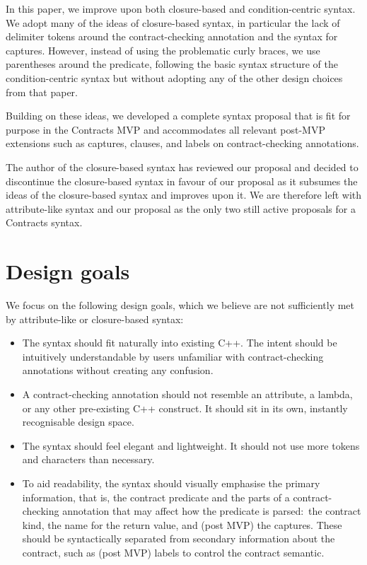 In this paper, we improve upon both closure-based and condition-centric syntax. We adopt many of the ideas of closure-based syntax, in particular the lack of delimiter tokens around the contract-checking annotation and the syntax for captures. However, instead of using the problematic curly braces, we use parentheses around the predicate, following the basic syntax structure of the condition-centric syntax \cite{P2737R0} but without adopting any of the other design choices from that paper.

Building on these ideas, we developed a complete syntax proposal that is fit for purpose in the Contracts MVP and accommodates all relevant post-MVP extensions such as captures,  clauses, and labels on contract-checking annotations.

The author of the closure-based syntax has reviewed our proposal and decided to discontinue the closure-based syntax in favour of our proposal as it subsumes the ideas of the closure-based syntax and improves upon it. We are therefore left with attribute-like syntax and our proposal as the only two still active proposals for a Contracts syntax.



\section{Design goals}
\label{sec:design}

We focus on the following design goals, which we believe are not sufficiently met by attribute-like or closure-based syntax:

\begin{itemize}
\item The syntax should fit naturally into existing C++. The intent should be intuitively understandable by users unfamiliar with contract-checking annotations without creating any confusion.
\item A contract-checking annotation should not resemble an attribute, a lambda, or any other pre-existing C++ construct. It should sit in its own, instantly recognisable design space.
\item The syntax should feel elegant and lightweight. It should not use more tokens and characters than necessary.
\item To aid readability, the syntax should visually emphasise the primary information, that is, the contract predicate and the parts of a contract-checking annotation that may affect how the predicate is parsed: the contract kind, the name for the return value, and (post MVP) the captures. These should be syntactically separated from secondary information about the contract, such as (post MVP) labels to control the contract semantic.
\end{itemize}

